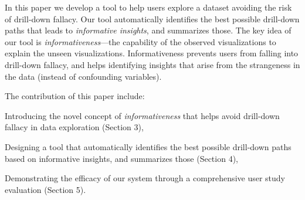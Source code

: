 In this paper we develop a tool to help users explore a dataset avoiding the risk of drill-down fallacy. Our tool automatically identifies the best possible drill-down paths that leads to \emph{informative insights}, and summarizes those. The key idea of our tool is \emph{informativeness}---the capability of the observed visualizations to explain the unseen visualizations. Informativeness prevents users from falling into drill-down fallacy, and helps identifying insights that arise from the strangeness in the data (instead of confounding variables).

The contribution of this paper include:
\begin{denselist}
\item Introducing the novel concept of \emph{informativeness} that helps avoid drill-down fallacy in data exploration (Section 3),
\item Designing a tool that automatically identifies the best possible drill-down paths based on informative insights, and summarizes those (Section 4),
\item Demonstrating the efficacy of our system through a comprehensive user study evaluation (Section 5).
\end{denselist}

\iffalse



